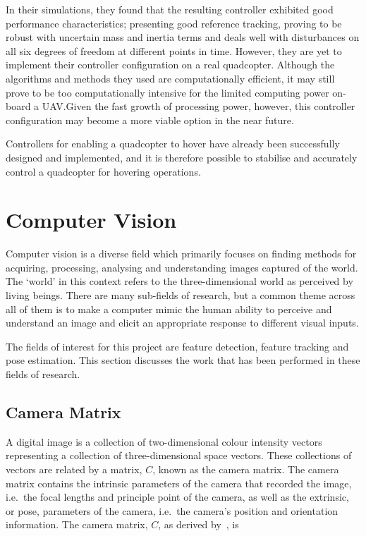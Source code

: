 In their simulations, they found that the resulting controller exhibited good performance characteristics; presenting good reference tracking, proving to be robust with uncertain mass and inertia terms and deals well with disturbances on all six degrees of freedom at different points in time. However, they are yet to implement their controller configuration on a real quadcopter. Although the algorithms and methods they used are computationally efficient, it may still prove to be too computationally intensive for the limited computing power on-board a UAV.\@ Given the fast growth of processing power, however, this controller configuration may become a more viable option in the near future. 

Controllers for enabling a quadcopter to hover have already been successfully designed and implemented, and it is therefore possible to stabilise and accurately control a quadcopter for hovering operations. 

\section{Computer Vision}

Computer vision is a diverse field which primarily focuses on finding methods for acquiring, processing, analysing and understanding images captured of the world. The `world' in this context refers to the three-dimensional world as perceived by living beings. There are many sub-fields of research, but a common theme across all of them is to make a computer mimic the human ability to perceive and understand an image and elicit an appropriate response to different visual inputs. 

The fields of interest for this project are feature detection, feature tracking and pose estimation. This section discusses the work that has been performed in these fields of research.  

\subsection{Camera Matrix}

A digital image is a collection of two-dimensional colour intensity vectors representing a collection of three-dimensional space vectors. These collections of vectors are related by a matrix, $C$, known as the camera matrix. The camera matrix contains the intrinsic parameters of the camera that recorded the image, i.e.\ the focal lengths and principle point of the camera, as well as the extrinsic, or pose, parameters of the camera, i.e.\ the camera's position and orientation information. The camera matrix, $C$, as derived by~\cite{heikkila1997four}, is 

